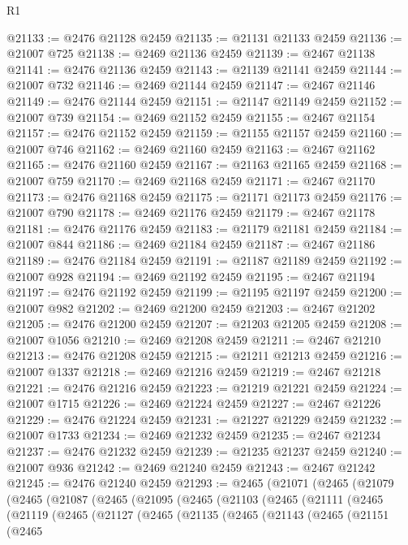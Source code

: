 \begin{lexlean}{R1}
\begin{coremodule}
@21133 := @2476 @21128 @2459
@21135 := @21131 @21133 @2459
@21136 := @21007 @725
@21138 := @2469 @21136 @2459
@21139 := @2467 @21138
@21141 := @2476 @21136 @2459
@21143 := @21139 @21141 @2459
@21144 := @21007 @732
@21146 := @2469 @21144 @2459
@21147 := @2467 @21146
@21149 := @2476 @21144 @2459
@21151 := @21147 @21149 @2459
@21152 := @21007 @739
@21154 := @2469 @21152 @2459
@21155 := @2467 @21154
@21157 := @2476 @21152 @2459
@21159 := @21155 @21157 @2459
@21160 := @21007 @746
@21162 := @2469 @21160 @2459
@21163 := @2467 @21162
@21165 := @2476 @21160 @2459
@21167 := @21163 @21165 @2459
@21168 := @21007 @759
@21170 := @2469 @21168 @2459
@21171 := @2467 @21170
@21173 := @2476 @21168 @2459
@21175 := @21171 @21173 @2459
@21176 := @21007 @790
@21178 := @2469 @21176 @2459
@21179 := @2467 @21178
@21181 := @2476 @21176 @2459
@21183 := @21179 @21181 @2459
@21184 := @21007 @844
@21186 := @2469 @21184 @2459
@21187 := @2467 @21186
@21189 := @2476 @21184 @2459
@21191 := @21187 @21189 @2459
@21192 := @21007 @928
@21194 := @2469 @21192 @2459
@21195 := @2467 @21194
@21197 := @2476 @21192 @2459
@21199 := @21195 @21197 @2459
@21200 := @21007 @982
@21202 := @2469 @21200 @2459
@21203 := @2467 @21202
@21205 := @2476 @21200 @2459
@21207 := @21203 @21205 @2459
@21208 := @21007 @1056
@21210 := @2469 @21208 @2459
@21211 := @2467 @21210
@21213 := @2476 @21208 @2459
@21215 := @21211 @21213 @2459
@21216 := @21007 @1337
@21218 := @2469 @21216 @2459
@21219 := @2467 @21218
@21221 := @2476 @21216 @2459
@21223 := @21219 @21221 @2459
@21224 := @21007 @1715
@21226 := @2469 @21224 @2459
@21227 := @2467 @21226
@21229 := @2476 @21224 @2459
@21231 := @21227 @21229 @2459
@21232 := @21007 @1733
@21234 := @2469 @21232 @2459
@21235 := @2467 @21234
@21237 := @2476 @21232 @2459
@21239 := @21235 @21237 @2459
@21240 := @21007 @936
@21242 := @2469 @21240 @2459
@21243 := @2467 @21242
@21245 := @2476 @21240 @2459
@21293 := @2465
    (@21071
      (@2465
        (@21079
          (@2465
            (@21087
              (@2465
                (@21095
                  (@2465
                    (@21103
                      (@2465
                        (@21111
                          (@2465
                            (@21119
                              (@2465
                                (@21127
                                  (@2465
                                    (@21135
                                      (@2465
                                        (@21143
                                          (@2465
                                            (@21151
                                              (@2465

\end{coremodule}
\end{lexlean}
